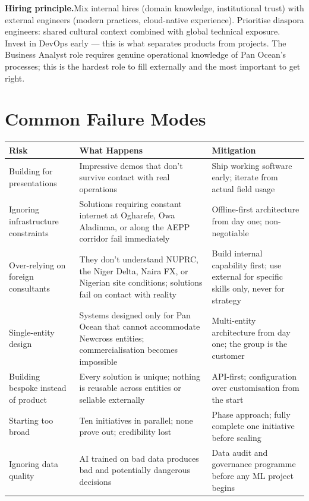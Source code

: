 \documentclass[10pt]{article}
\begin{document}
\vspace{4pt}
{\small\color{darkgrey}
\textbf{Hiring principle.}\enspace Mix internal hires (domain knowledge, institutional
trust) with external engineers (modern practices, cloud-native experience). Prioritise
diaspora engineers: shared cultural context combined with global technical exposure.
Invest in DevOps early --- this is what separates products from projects.
The Business Analyst role requires genuine operational knowledge of Pan Ocean's
processes; this is the hardest role to fill externally and the most important to
get right.
}

\vspace{10pt}

\section{Common Failure Modes}

\small
\begin{tabularx}{\columnwidth}{@{}lXX@{}}
\toprule
\textbf{Risk} & \textbf{What Happens} & \textbf{Mitigation} \\
\midrule
Building for presentations
  & Impressive demos that don't survive contact with real operations
  & Ship working software early; iterate from actual field usage \\[3pt]
Ignoring infrastructure constraints
  & Solutions requiring constant internet at Ogharefe, Owa Aladinma,
    or along the AEPP corridor fail immediately
  & Offline-first architecture from day one; non-negotiable \\[3pt]
Over-relying on foreign consultants
  & They don't understand NUPRC, the Niger Delta, Naira FX, or
    Nigerian site conditions; solutions fail on contact with reality
  & Build internal capability first; use external for specific
    skills only, never for strategy \\[3pt]
Single-entity design
  & Systems designed only for Pan Ocean that cannot accommodate
    Newcross entities; commercialisation becomes impossible
  & Multi-entity architecture from day one; the group is the customer \\[3pt]
Building bespoke instead of product
  & Every solution is unique; nothing is reusable across entities
    or sellable externally
  & API-first; configuration over customisation from the start \\[3pt]
Starting too broad
  & Ten initiatives in parallel; none prove out; credibility lost
  & Phase approach; fully complete one initiative before scaling \\[3pt]
Ignoring data quality
  & AI trained on bad data produces bad and potentially dangerous decisions
  & Data audit and governance programme before any ML project begins \\
\bottomrule
\end{tabularx}
\normalsize
\end{document}
